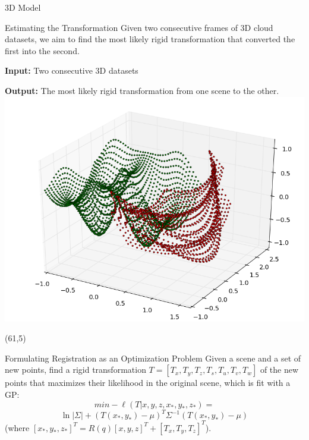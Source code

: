\documentclass[final]{beamer}
\begin{document}
\begin{frame}{}
\begin{textblock}{27.5}
\begin{block}{3D Model}
\end{block}

\begin{block}{Estimating the Transformation}
Given two consecutive frames of 3D cloud datasets, we aim to find the most likely rigid transformation that converted the first into the second.

\textbf{Input:} Two consecutive 3D datasets

\textbf{Output:} The most likely rigid transformation from one scene to the other.
\includegraphics[width=10in]{3DWorldModel.png}
\end{block}

\end{textblock}

\begin{textblock}{27}(61,5)




\begin{block}{Formulating Registration as an Optimization Problem}
Given a scene and a set of new points, find a rigid transformation $T = [T_x,T_y,T_z,T_s,T_u,T_v,T_w]$ of the new points 
that maximizes their likelihood in the original scene, which is fit with a GP:
$$min -\ell(T|x,y,z,x_*,y_*,z_*) =$$
$$ \ln|\Sigma| + (T(x_*,y_*) - \mu)^T \Sigma^{-1} (T(x_*,y_*) - \mu)$$
(where $[x_*,y_*,z_*]^T = R(q)[x,y,z]^T + [T_x,T_y,T_z]^T$).

\end{block}



\end{textblock}
\end{frame}
\end{document}
